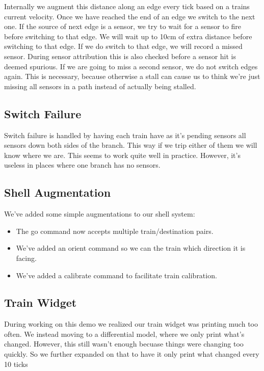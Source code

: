 \documentclass{article}
\begin{document}
Internally we augment this distance along an edge every tick based on a trains current velocity. Once we have reached the end of an edge we switch to the next one. If the source of next edge is a sensor, we try to wait for a sensor to fire before switching to that edge. We will wait up to 10cm of extra distance before switching to that edge. If we do switch to that edge, we will record a missed sensor. During sensor attribution this is also checked before a sensor hit is deemed spurious. If we are going to miss a second sensor, we do not switch edges again. This is necessary, because otherwise a stall can cause us to think we're just missing all sensors in a path instead of actually being stalled.

\subsection{Switch Failure}

Switch failure is handled by having each train have as it's pending sensors all sensors down both sides of the branch. This way if we trip either of them we will know where we are. This seems to work quite well in practice. However, it's useless in places where one branch has no sensors.

\subsection{Shell Augmentation}

We've added some simple augmentations to our shell system:
\begin{itemize}
  \item The go command now accepts multiple train/destination pairs.
  \item We've added an orient command so we can the train which direction it is facing.
  \item We've added a calibrate command to facilitate train calibration.
\end{itemize}

\subsection{Train Widget}

During working on this demo we realized our train widget was printing much too often. We instead moving to a differential model, where we only print what's changed. However, this still wasn't enough becuase things were changing too quickly. So we further expanded on that to have it only print what changed every 10 ticks
\end{document}
